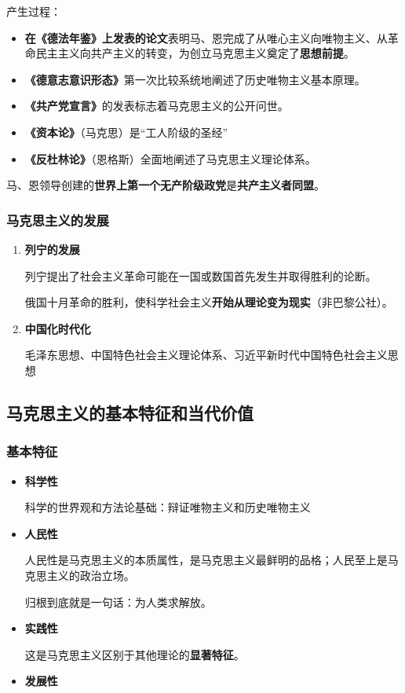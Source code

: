 \documentclass[12pt, a4paper, oneside]{ctexart}
\begin{document}
产生过程：
\begin{itemize}
  \item \textbf{在《德法年鉴》上发表的论文}表明马、恩完成了从唯心主义向唯物主义、从革命民主主义向共产主义的转变，为创立马克思主义奠定了\textbf{思想前提}。
  \item \textbf{《德意志意识形态》}第一次比较系统地阐述了历史唯物主义基本原理。
  \item \textbf{《共产党宣言》}的发表标志着马克思主义的公开问世。
  \item \textbf{《资本论》}（马克思）是“工人阶级的圣经”
  \item \textbf{《反杜林论》}（恩格斯）全面地阐述了马克思主义理论体系。
\end{itemize}

马、恩领导创建的\textbf{世界上第一个无产阶级政党}是\textbf{共产主义者同盟}。

\subsubsection{马克思主义的发展}

\begin{enumerate}
  \item {\bf 列宁的发展}
  
  列宁提出了社会主义革命可能在一国或数国首先发生并取得胜利的论断。

  俄国十月革命的胜利，使科学社会主义\textbf{开始从理论变为现实}（非巴黎公社）。

  \item {\bf 中国化时代化}
  
  毛泽东思想、中国特色社会主义理论体系、习近平新时代中国特色社会主义思想
\end{enumerate}

\subsection{马克思主义的基本特征和当代价值}

\subsubsection{基本特征}

\begin{itemize}
  \item {\bf 科学性}
  
  科学的世界观和方法论基础：辩证唯物主义和历史唯物主义

  \item {\bf 人民性}
  
  人民性是马克思主义的本质属性，是马克思主义最鲜明的品格；人民至上是马克思主义的政治立场。

  归根到底就是一句话：为人类求解放。
  
  \item {\bf 实践性}
  
  这是马克思主义区别于其他理论的\textbf{显著特征}。

  \item {\bf 发展性}
\end{itemize}
\end{document}
